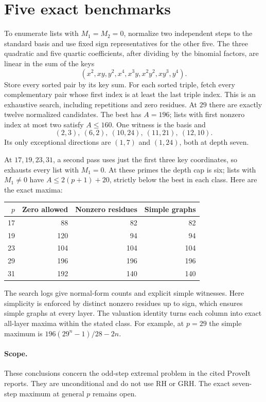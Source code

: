 \documentclass[11pt]{article}
\begin{document}
\section{Five exact benchmarks}
To enumerate lists with $M_1=M_2=0$, normalize two independent
steps to the standard basis and use fixed sign representatives
for the other five. The three quadratic and five quartic
coefficients, after dividing by the binomial factors, are
linear in the sum of the keys
\[
  (x^2,xy,y^2,x^4,x^3y,x^2y^2,xy^3,y^4).
\]
Store every sorted pair by its key sum. For each sorted triple,
fetch every complementary pair whose first index is at least the
last triple index. This is an exhaustive search, including
repetitions and zero residues. At $29$ there are exactly twelve
normalized candidates. The best has $A=196$; lists with first
nonzero index at most two satisfy $A\le160$. One witness is the
basis and
\[
  (2,3),\ (6,2),\ (10,24),\ (11,21),\ (12,10).
\]
Its only exceptional directions are $(1,7)$ and $(1,24)$, both at
depth seven.

At $17,19,23,31$, a second pass uses just the first three key
coordinates, so exhausts every list with $M_1=0$. At these primes
the depth cap is six; lists with $M_1\ne0$ have $A\le2(p+1)+20$,
strictly below the best in each class. Here are the exact maxima:
\begin{center}
\begin{tabular}{@{}rrrr@{}}
\toprule
$p$ & Zero allowed & Nonzero residues & Simple graphs\\
\midrule
17 & 88  & 82  & 82\\
19 & 120 & 94  & 94\\
23 & 104 & 104 & 104\\
29 & 196 & 196 & 196\\
31 & 192 & 140 & 140\\
\bottomrule
\end{tabular}
\end{center}
The search logs give normal-form counts and explicit simple
witnesses. Here simplicity is enforced by distinct nonzero
residues up to sign, which ensures simple graphs at every layer.
The valuation identity turns each column into exact all-layer
maxima within the stated class.
For example, at $p=29$ the simple maximum is
$196(29^n-1)/28-2n$.

\paragraph{Scope.}
These conclusions concern the odd-step extremal problem in the
cited ProveIt reports. They are unconditional and do not
use RH or GRH. The exact seven-step maximum at general $p$ remains open.
\end{document}
